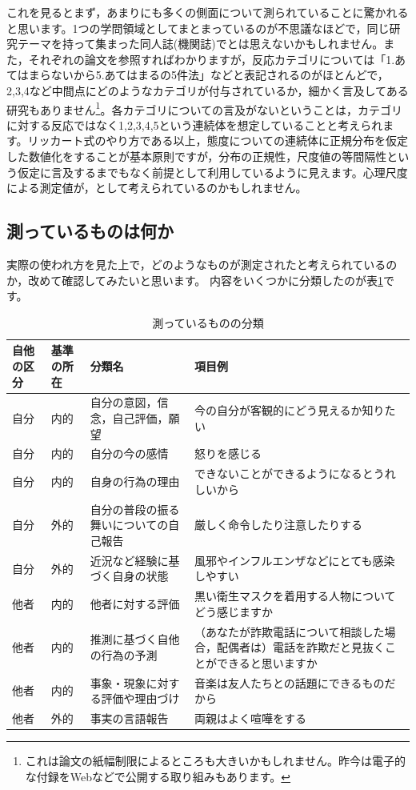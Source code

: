 \documentclass{ltjsbook}
\begin{document}
これを見るとまず，あまりにも多くの側面について測られていることに驚かれると思います。1つの学問領域としてまとまっているのが不思議なほどで，同じ研究テーマを持って集まった同人誌(機関誌)でとは思えないかもしれません。また，それぞれの論文を参照すればわかりますが，反応カテゴリについては「1.あてはまらないから5.あてはまるの5件法」などと表記されるのがほとんどで，2,3,4など中間点にどのようなカテゴリが付与されているか，細かく言及してある研究もありません\footnote{これは論文の紙幅制限によるところも大きいかもしれません。昨今は電子的な付録をWebなどで公開する取り組みもあります。}。各カテゴリについての言及がないということは，カテゴリに対する反応ではなく1,2,3,4,5という連続体を想定していることと考えられます。リッカート式のやり方である以上，態度についての連続体に正規分布を仮定した数値化をすることが基本原則ですが，分布の正規性，尺度値の等間隔性という仮定に言及するまでもなく前提として利用しているように見えます。心理尺度による測定値が，として考えられているのかもしれません。

\subsection{測っているものは何か}
実際の使われ方を見た上で，どのようなものが測定されたと考えられているのか，改めて確認してみたいと思います。
内容をいくつかに分類したのが表\ref{ScaledObj}です。
\begin{table}
	\caption{測っているものの分類}
	\label{ScaledObj}
	\begin{tabular}{p{1cm}p{1cm}p{4cm}p{6cm}}
		自他の区分 & 基準の所在 & 分類名                 & 項目例                                             \\\hline
		自分    & 内的    & 自分の意図，信念，自己評価，願望    & 今の自分が客観的にどう見えるか知りたい                             \\
		自分    & 内的    & 自分の今の感情             & 怒りを感じる                                          \\
		自分    & 内的    & 自身の行為の理由            & できないことができるようになるとうれしいから                          \\
		自分    & 外的    & 自分の普段の振る舞いについての自己報告 & 厳しく命令したり注意したりする                                 \\
		自分    & 外的    & 近況など経験に基づく自身の状態     & 風邪やインフルエンザなどにとても感染しやすい                          \\
		他者    & 内的    & 他者に対する評価            & 黒い衛生マスクを着用する人物についてどう感じますか                       \\
		他者    & 内的    & 推測に基づく自他の行為の予測      & （あなたが詐欺電話について相談した場合，配偶者は）電話を詐欺だと見抜くことができると思いますか \\
		他者    & 内的    & 事象・現象に対する評価や理由づけ    & 音楽は友人たちとの話題にできるものだから                            \\
		他者    & 外的    & 事実の言語報告             & 両親はよく喧嘩をする                                      \\\hline
	\end{tabular}
\end{table}
\end{document}
